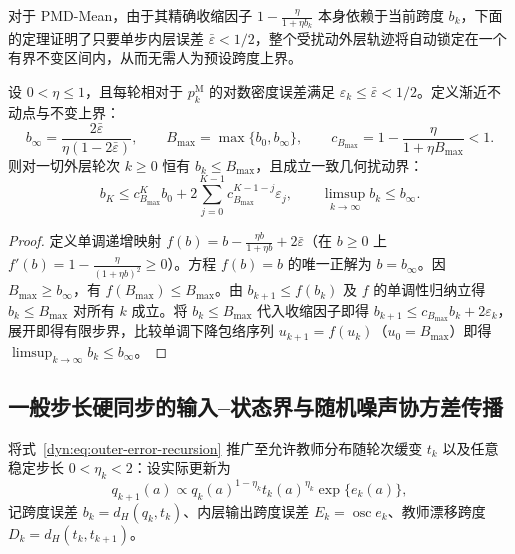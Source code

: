 \documentclass[lang=cn,scheme=chinese,openany]{elegantbook}
\begin{document}
对于 PMD-Mean，由于其精确收缩因子 $1-\frac{\eta}{1+\eta b_k}$ 本身依赖于当前跨度 $b_k$，下面的定理证明了只要单步内层误差 $\bar\varepsilon<1/2$，整个受扰动外层轨迹将自动锁定在一个有界不变区间内，从而无需人为预设跨度上界。

\begin{theorem}
设 $0<\eta\leq1$，且每轮相对于 $p_k^{\mathrm M}$ 的对数密度误差满足 $\varepsilon_k\leq\bar\varepsilon<1/2$。定义渐近不动点与不变上界：
\begin{equation*}
 b_\infty=\frac{2\bar\varepsilon}{\eta(1-2\bar\varepsilon)},\qquad
 B_{\max}=\max\{b_0,b_\infty\},\qquad
 c_{B_{\max}}=1-\frac{\eta}{1+\eta B_{\max}}<1.
\end{equation*}
则对一切外层轮次 $k\ge 0$ 恒有 $b_k\leq B_{\max}$，且成立一致几何扰动界：
\begin{equation*}
 b_K\leq c_{B_{\max}}^K b_0+
     2\sum_{j=0}^{K-1}c_{B_{\max}}^{K-1-j}\varepsilon_j,
 \qquad \limsup_{k\to\infty}b_k\leq b_\infty.
\end{equation*}
\end{theorem}
\begin{proof}
定义单调递增映射 $f(b)=b-\frac{\eta b}{1+\eta b}+2\bar\varepsilon$（在 $b\ge 0$ 上 $f'(b)=1-\frac{\eta}{(1+\eta b)^2}\ge 0$）。方程 $f(b)=b$ 的唯一正解为 $b=b_\infty$。因 $B_{\max}\ge b_\infty$，有 $f(B_{\max})\le B_{\max}$。由 $b_{k+1}\le f(b_k)$ 及 $f$ 的单调性归纳立得 $b_k\le B_{\max}$ 对所有 $k$ 成立。将 $b_k\le B_{\max}$ 代入收缩因子即得 $b_{k+1}\le c_{B_{\max}}b_k+2\varepsilon_k$，展开即得有限步界，比较单调下降包络序列 $u_{k+1}=f(u_k)$（$u_0=B_{\max}$）即得 $\limsup_{k\to\infty}b_k\le b_\infty$。
\end{proof}

\subsection{一般步长硬同步的输入--状态界与随机噪声协方差传播}

将式~\eqref{dyn:eq:outer-error-recursion} 推广至允许教师分布随轮次缓变 $t_k$ 以及任意稳定步长 $0<\eta_k<2$：设实际更新为
\begin{equation}\label{dyn:eq:hs-noisy-update}
 q_{k+1}(a)\propto q_k(a)^{1-\eta_k}t_k(a)^{\eta_k}
             \exp\{e_k(a)\},
\end{equation}
记跨度误差 $b_k=d_H(q_k,t_k)$、内层输出跨度误差 $E_k=\operatorname{osc}e_k$、教师漂移跨度 $D_k=d_H(t_k,t_{k+1})$。
\end{document}
